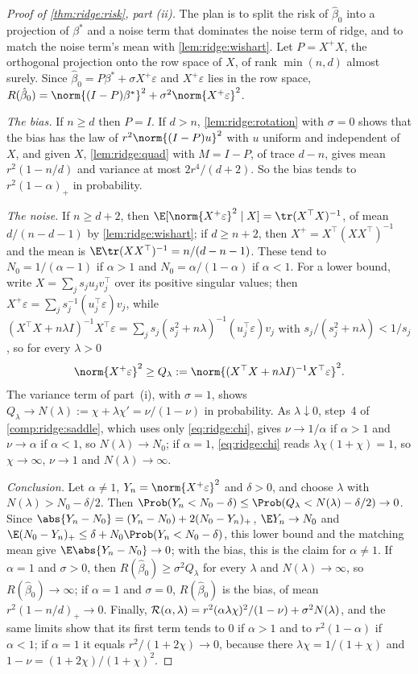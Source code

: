 \begin{refsection}
\begin{proof}[Proof of \cref{thm:ridge:risk}, part (ii)]
The plan is to split the risk of $\hat\beta_0$ into a projection of $\beta^*$ and a noise term that dominates the noise term of ridge, and to match the noise term's mean with \cref{lem:ridge:wishart}. Let $P=X^+X$, the orthogonal projection onto the row space of $X$, of rank $\min(n,d)$ almost surely. Since $\hat\beta_0=P\beta^*+\sigma X^+\varepsilon$ and $X^+\varepsilon$ lies in the row space, $R(\hat\beta_0)=\norm{(I-P)\beta^*}^2+\sigma^2\norm{X^+\varepsilon}^2$.

\emph{The bias.} If $n\ge d$ then $P=I$. If $d>n$, \cref{lem:ridge:rotation} with $\sigma=0$ shows that the bias has the law of $r^2\norm{(I-P)u}^2$ with $u$ uniform and independent of $X$, and given $X$, \cref{lem:ridge:quad} with $M=I-P$, of trace $d-n$, gives mean $r^2(1-n/d)$ and variance at most $2r^4/(d+2)$. So the bias tends to $r^2(1-\alpha)_+$ in probability.

\emph{The noise.} If $n\ge d+2$, then $\E[\norm{X^+\varepsilon}^2\mid X]=\tr(X^\top X)^{-1}$, of mean $d/(n-d-1)$ by \cref{lem:ridge:wishart}; if $d\ge n+2$, then $X^+=X^\top(XX^\top)^{-1}$ and the mean is $\E\tr(XX^\top)^{-1}=n/(d-n-1)$. These tend to $N_0=1/(\alpha-1)$ if $\alpha>1$ and $N_0=\alpha/(1-\alpha)$ if $\alpha<1$. For a lower bound, write $X=\sum_js_ju_jv_j^\top$ over its positive singular values; then $X^+\varepsilon=\sum_js_j^{-1}(u_j^\top\varepsilon)v_j$, while $(X^\top X+n\lambda I)^{-1}X^\top\varepsilon=\sum_js_j(s_j^2+n\lambda)^{-1}(u_j^\top\varepsilon)v_j$ with $s_j/(s_j^2+n\lambda)<1/s_j$, so for every $\lambda>0$
\[
\norm{X^+\varepsilon}^2\ge Q_\lambda:=\norm{(X^\top X+n\lambda I)^{-1}X^\top\varepsilon}^2.
\]
The variance term of part~(i), with $\sigma=1$, shows $Q_\lambda\to N(\lambda):=\chi+\lambda\chi'=\nu/(1-\nu)$ in probability. As $\lambda\downarrow0$, step~4 of \cref{comp:ridge:saddle}, which uses only \eqref{eq:ridge:chi}, gives $\nu\to1/\alpha$ if $\alpha>1$ and $\nu\to\alpha$ if $\alpha<1$, so $N(\lambda)\to N_0$; if $\alpha=1$, \eqref{eq:ridge:chi} reads $\lambda\chi(1+\chi)=1$, so $\chi\to\infty$, $\nu\to1$ and $N(\lambda)\to\infty$.

\emph{Conclusion.} Let $\alpha\ne1$, $Y_n=\norm{X^+\varepsilon}^2$ and $\delta>0$, and choose $\lambda$ with $N(\lambda)>N_0-\delta/2$. Then $\Prob(Y_n<N_0-\delta)\le\Prob(Q_\lambda<N(\lambda)-\delta/2)\to0$. Since $\abs{Y_n-N_0}=(Y_n-N_0)+2(N_0-Y_n)_+$, $\E Y_n\to N_0$ and $\E(N_0-Y_n)_+\le\delta+N_0\Prob(Y_n<N_0-\delta)$, this lower bound and the matching mean give $\E\abs{Y_n-N_0}\to0$; with the bias, this is the claim for $\alpha\ne1$. If $\alpha=1$ and $\sigma>0$, then $R(\hat\beta_0)\ge\sigma^2Q_\lambda$ for every $\lambda$ and $N(\lambda)\to\infty$, so $R(\hat\beta_0)\to\infty$; if $\alpha=1$ and $\sigma=0$, $R(\hat\beta_0)$ is the bias, of mean $r^2(1-n/d)_+\to0$. Finally, $\mathcal{R}(\alpha,\lambda)=r^2(\alpha\lambda\chi)^2/(1-\nu)+\sigma^2N(\lambda)$, and the same limits show that its first term tends to $0$ if $\alpha>1$ and to $r^2(1-\alpha)$ if $\alpha<1$; if $\alpha=1$ it equals $r^2/(1+2\chi)\to0$, because there $\lambda\chi=1/(1+\chi)$ and $1-\nu=(1+2\chi)/(1+\chi)^2$.
\end{proof}


\end{refsection}
